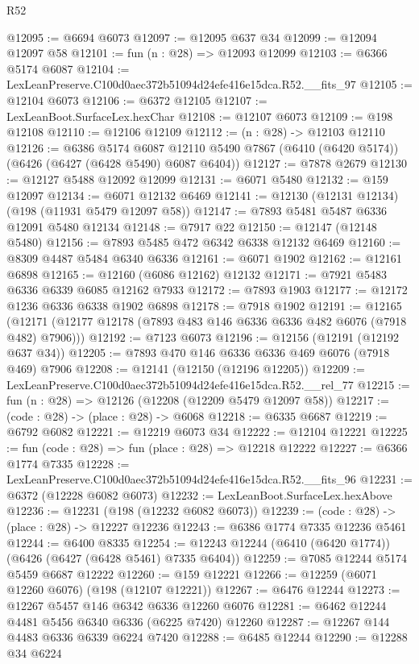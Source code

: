 \begin{lexlean}{R52}
\begin{coremodule}
@12095 := @6694 @6073
@12097 := @12095 @637 @34
@12099 := @12094 @12097 @58
@12101 := fun (n : @28) => @12093 @12099
@12103 := @6366 @5174 @6087
@12104 := LexLeanPreserve.C100d0aec372b51094d24efe416e15dca.R52.__fits_97
@12105 := @12104 @6073
@12106 := @6372 @12105
@12107 := LexLeanBoot.SurfaceLex.hexChar
@12108 := @12107 @6073
@12109 := @198 @12108
@12110 := @12106 @12109
@12112 := (n : @28) -> @12103 @12110
@12126 := @6386
    @5174
    @6087
    @12110
    @5490
    @7867
    (@6410 (@6420 @5174))
    (@6426 (@6427 (@6428 @5490) @6087 @6404))
@12127 := @7878 @2679
@12130 := @12127 @5488 @12092 @12099
@12131 := @6071 @5480
@12132 := @159 @12097
@12134 := @6071 @12132 @6469
@12141 := @12130 (@12131 @12134) (@198 (@11931 @5479 @12097 @58))
@12147 := @7893 @5481 @5487 @6336 @12091 @5480 @12134
@12148 := @7917 @22
@12150 := @12147 (@12148 @5480)
@12156 := @7893 @5485 @472 @6342 @6338 @12132 @6469
@12160 := @8309 @4487 @5484 @6340 @6336
@12161 := @6071 @1902
@12162 := @12161 @6898
@12165 := @12160 (@6086 @12162) @12132
@12171 := @7921 @5483 @6336 @6339 @6085 @12162 @7933
@12172 := @7893 @1903
@12177 := @12172 @1236 @6336 @6338 @1902 @6898
@12178 := @7918 @1902
@12191 := @12165
    (@12171 (@12177 @12178 (@7893 @483 @146 @6336 @6336 @482 @6076 (@7918 @482) @7906)))
@12192 := @7123 @6073
@12196 := @12156 (@12191 (@12192 @637 @34))
@12205 := @7893 @470 @146 @6336 @6336 @469 @6076 (@7918 @469) @7906
@12208 := @12141 (@12150 (@12196 @12205))
@12209 := LexLeanPreserve.C100d0aec372b51094d24efe416e15dca.R52.__rel_77
@12215 := fun (n : @28) => @12126 (@12208 (@12209 @5479 @12097 @58))
@12217 := (code : @28) -> (place : @28) -> @6068
@12218 := @6335 @6687
@12219 := @6792 @6082
@12221 := @12219 @6073 @34
@12222 := @12104 @12221
@12225 := fun (code : @28) => fun (place : @28) => @12218 @12222
@12227 := @6366 @1774 @7335
@12228 := LexLeanPreserve.C100d0aec372b51094d24efe416e15dca.R52.__fits_96
@12231 := @6372 (@12228 @6082 @6073)
@12232 := LexLeanBoot.SurfaceLex.hexAbove
@12236 := @12231 (@198 (@12232 @6082 @6073))
@12239 := (code : @28) -> (place : @28) -> @12227 @12236
@12243 := @6386 @1774 @7335 @12236 @5461
@12244 := @6400 @8335
@12254 := @12243 @12244 (@6410 (@6420 @1774)) (@6426 (@6427 (@6428 @5461) @7335 @6404))
@12259 := @7085 @12244 @5174 @5459 @6687 @12222
@12260 := @159 @12221
@12266 := @12259 (@6071 @12260 @6076) (@198 (@12107 @12221))
@12267 := @6476 @12244
@12273 := @12267 @5457 @146 @6342 @6336 @12260 @6076
@12281 := @6462 @12244 @4481 @5456 @6340 @6336 (@6225 @7420) @12260
@12287 := @12267 @144 @4483 @6336 @6339 @6224 @7420
@12288 := @6485 @12244
@12290 := @12288 @34 @6224

\end{coremodule}
\end{lexlean}
